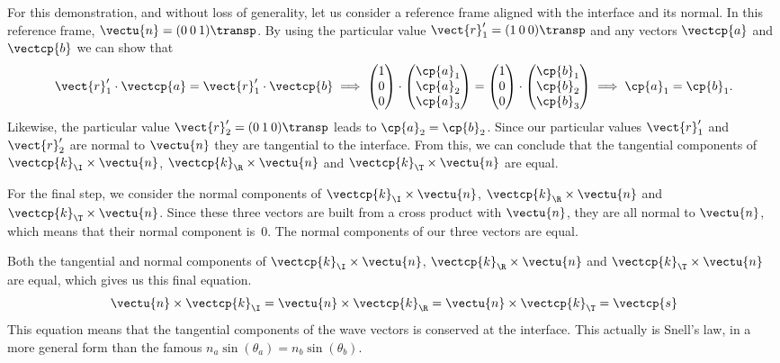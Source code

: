 \begin{refsection}
For this demonstration, and without loss of generality, let us consider a reference frame aligned with the interface and its normal.
In this reference frame, $\vectu{n}=(0 \: 0 \: 1)\transp$.
By using the particular value $\vect{r}_1'=(1 \: 0 \: 0)\transp$ and any vectors $\vectcp{a}$ and $\vectcp{b}$ we can show that
\begin{equation}
    \vect{r}_1' \cdot \vectcp{a} = \vect{r}_1' \cdot \vectcp{b}
    \implies
    \begin{pmatrix}
        1 \\ 0 \\ 0
    \end{pmatrix}
    \cdot
    \begin{pmatrix}
        \cp{a}_1 \\ \cp{a}_2 \\ \cp{a}_3
    \end{pmatrix}
    =
    \begin{pmatrix}
        1 \\ 0 \\ 0
    \end{pmatrix}
    \cdot
    \begin{pmatrix}
        \cp{b}_1 \\ \cp{b}_2 \\ \cp{b}_3
    \end{pmatrix}
    \implies
    \cp{a}_1 = \cp{b}_1
    \text{.}
\end{equation}
Likewise, the particular value $\vect{r}_2' = (0 \: 1 \: 0)\transp$ leads to $\cp{a}_2 = \cp{b}_2$.
Since our particular values $\vect{r}_1'$ and $\vect{r}_2'$ are normal to $\vectu{n}$ they are tangential to the interface.
From this, we can conclude that the tangential components of $\vectcp{k}_\I \times \vectu{n}$, $\vectcp{k}_\R \times \vectu{n}$ and $\vectcp{k}_\T \times \vectu{n}$ are equal.

For the final step, we consider the normal components of $\vectcp{k}_\I \times \vectu{n}$, $\vectcp{k}_\R \times \vectu{n}$ and $\vectcp{k}_\T \times \vectu{n}$.
Since these three vectors are built from a cross product with $\vectu{n}$, they are all normal to $\vectu{n}$, which means that their normal component is~$0$.
The normal components of our three vectors are equal.

Both the tangential and normal components of $\vectcp{k}_\I \times \vectu{n}$, $\vectcp{k}_\R \times \vectu{n}$ and $\vectcp{k}_\T \times \vectu{n}$ are equal, which gives us this final equation.
\begin{equation}
    \vectu{n} \times \vectcp{k}_\I =
    \vectu{n} \times \vectcp{k}_\R =
    \vectu{n} \times \vectcp{k}_\T =
    \vectcp{s}
    \label{eq:plane_of_incidence_normal}
\end{equation}
This equation means that the tangential components of the wave vectors is conserved at the interface.
This actually is Snell's law, in a more general form than the famous $n_a \sin(\theta_a) = n_b \sin(\theta_b)$.


\end{refsection}
